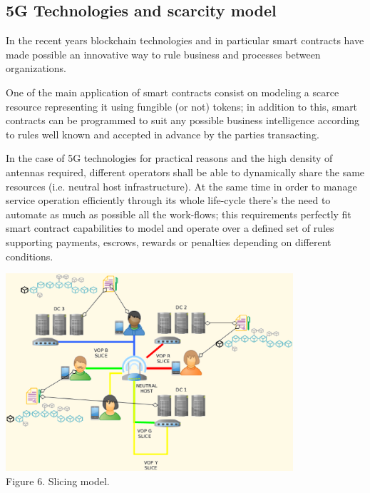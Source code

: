\documentclass[12pt]{amsart}
\begin{document}
\begin{multicols}{2}
\subsection{5G Technologies and scarcity model}
\vspace{0.35cm}

In the recent years blockchain technologies
and in particular smart contracts have made possible
an innovative way to rule business and
processes between organizations.

\vspace{0.35cm}

One of the main application of smart contracts
consist on modeling a scarce resource representing
it using fungible (or not) tokens; in addition
to this, smart contracts can be programmed
to suit any possible business intelligence
according to rules well known and accepted
in advance by the parties transacting.

\vspace{0.35cm}

In the case of 5G technologies for practical reasons
and the high density of antennas required,
different operators shall be able
to dynamically share the same resources (i.e. neutral host
infrastructure)\cite{neutral}. At the same time
in order to manage
service operation efficiently through its whole
life-cycle there's the need to automate as much as
possible all the work-flows; this requirements
perfectly fit smart contract capabilities
to model and operate over a defined set of rules
supporting payments, escrows, rewards or penalties
depending on different conditions.

\end{multicols}
\begin{center}
  \includegraphics[keepaspectratio, width=0.8\textwidth]{images/bc5g/slices-y.eps}
\\
Figure 6. Slicing model.
\\
\end{center}
\end{document}
